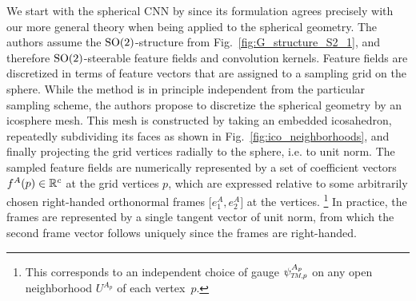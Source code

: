 We start with the spherical CNN by \citet{kicanaoglu2019gaugeSphere} since its formulation agrees precisely with our more general theory when being applied to the spherical geometry.
The authors assume the $\operatorname{SO}(2)$-structure from Fig.~\ref{fig:G_structure_S2_1}, and therefore $\operatorname{SO}(2)$-steerable feature fields and convolution kernels.
Feature fields are discretized in terms of feature vectors that are assigned to a sampling grid on the sphere.
While the method is in principle independent from the particular sampling scheme, the authors propose to discretize the spherical geometry by an icosphere mesh.
This mesh is constructed by taking an embedded icosahedron, repeatedly subdividing its faces as shown in Fig.~\ref{fig:ico_neighborhoods}, and finally projecting the grid vertices radially to the sphere, i.e. to unit norm.
The sampled feature fields are numerically represented by a set of coefficient vectors $f^A(p) \in \mathbb{R}^c$ at the grid vertices $p$, which are expressed relative to some arbitrarily chosen right-handed orthonormal frames $\big[e_1^A, e_2^A \big]$ at the vertices.%
\footnote{
    This corresponds to an independent choice of gauge $\psiTMp^{A_p}$ on any open neighborhood $U^{A_p}$ of each vertex~$p$.
}
In practice, the frames are represented by a single tangent vector of unit norm, from which the second frame vector follows uniquely since the frames are right-handed.


